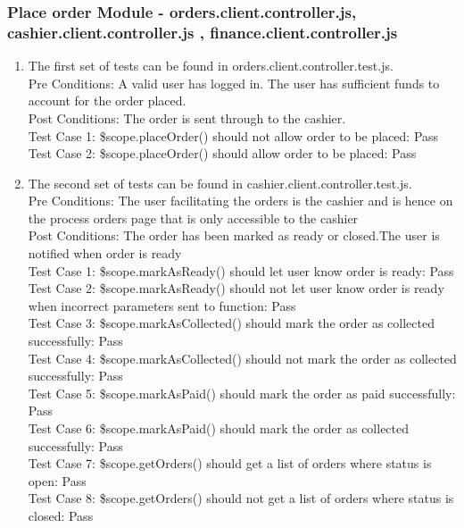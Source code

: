 \documentclass[a4paper,12pt]{article}
\begin{document}
\subsubsection{Place order Module - orders.client.controller.js, cashier.client.controller.js , finance.client.controller.js}
\begin{enumerate}

\item The first set of tests can be found in orders.client.controller.test.js.\\
Pre Conditions: A valid user has logged in. The user has sufficient funds to account for the order placed.\\
Post Conditions: The order is sent through to the cashier. \\
Test Case 1: \$scope.placeOrder() should not allow order to be placed: Pass\\
Test Case 2: \$scope.placeOrder() should allow order to be placed: Pass\\

\item The second set of tests can be found in cashier.client.controller.test.js.\\
Pre Conditions: The user facilitating the orders is the cashier and is hence on the process orders page that is only accessible to the cashier\\
Post Conditions: The order has been marked as ready or closed.The user is notified when order is ready\\
Test Case 1: \$scope.markAsReady() should let user know order is ready: Pass\\
Test Case 2: \$scope.markAsReady() should not let user know order is ready when incorrect parameters sent to function: Pass \\
Test Case 3: \$scope.markAsCollected() should  mark the order as collected successfully: Pass \\
Test Case 4: \$scope.markAsCollected() should not mark the order as collected successfully: Pass \\
Test Case 5: \$scope.markAsPaid() should  mark the order as paid successfully: Pass \\
Test Case 6: \$scope.markAsPaid() should  mark the order as collected successfully: Pass \\
Test Case 7: \$scope.getOrders() should get a list of orders where status is open: Pass \\
Test Case 8: \$scope.getOrders() should not get a list of orders where status is closed: Pass \\


\end{enumerate}
\end{document}

